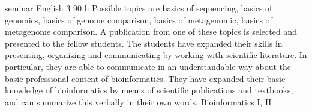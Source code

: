 {seminar}
{English}
{3}
{90 h}
{Possible topics are basics of sequencing, basics of genomics, basics of genome comparison, basics of metagenomic, basics of metagenome comparison. A publication from one of these topics is selected and presented to the fellow students.} 
{The students have expanded their skills in presenting, organizing and communicating by working with scientific literature. In particular, they are able to communicate in an understandable way about the basic professional content of bioinformatics. They have expanded their basic knowledge of bioinformatics by means of scientific publications and textbooks, and can summarize this verbally in their own words.}
{Bioinformatics I, II}